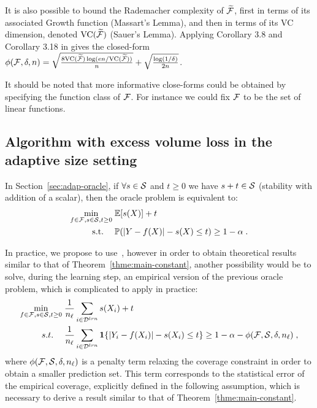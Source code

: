 It is also possible to bound the Rademacher complexity of $\widetilde{\mathcal{F}}$, first in terms of its associated Growth function (Massart's Lemma), and then in terms of its VC dimension, denoted $\text{VC}(\widetilde{\mathcal{F}})$ (Sauer's Lemma). Applying Corollary 3.8 and Corollary 3.18 in \citet{mohri2018foundations} gives the closed-form ${\phi(\mathcal{F},\delta,n)} = \sqrt{\frac{8\text{VC}(\widetilde{\mathcal{F}})\log(en/\text{VC}(\widetilde{\mathcal{F}}))}{n}}+\sqrt{\frac{\log(1/\delta)}{2n}}$.

It should be noted that more informative close-forms could be obtained by specifying the function class of $\mathcal{F}$. For instance we could fix $\mathcal{F}$ to be the set of linear functions. 




\subsection{Algorithm with excess volume loss in the adaptive size setting} %
\label{sec:adapt-bonus}




In Section~\ref{sec:adap-oracle}, if $\forall s\in {\cal S}$ and $t\geq 0$ we have $s+t\in{\cal S}$ (stability with addition of a scalar), then the oracle problem is equivalent to:
\begin{align*}
    \min_{f\in\mathcal{F},s\in{\cal S},t\geq 0} &\; \mathbb{E}[s(X)] + t \\
     \quad \text{s.t.} \quad &\;  {\mathbb{P}}(|Y-f(X)| - s(X)\leq t) \geq 1-\alpha
     \;. \nonumber
\end{align*}

In practice, we propose to use~\methodAD, however in order to obtain theoretical results similar to that of Theorem~\ref{thme:main-constant}, another possibility would be to solve, during the learning step, an empirical version of the previous oracle problem, which is complicated to apply in practice:
\begin{align}
    \min_{f\in\mathcal{F},s\in{\cal S},t\geq 0} &\; \frac{1}{n_\ell}\sum_{i\in{\cal D}^{lrn}}s(X_i) + t \label{eq:new-algo-adap} \\
     \quad s.t. \quad &\;  \frac{1}{n_\ell}\sum_{i\in{\cal D}^{lrn}}\mathbf{1}\{|Y_i-f(X_i)|-s(X_i)\leq t\}\geq 1-\alpha - {\phi(\mathcal{F},{\cal S},\delta,n_\ell)}
     \;, \nonumber
\end{align}
where ${\phi(\mathcal{F},{\cal S},\delta,n_\ell)}$ is a penalty term relaxing the coverage constraint in order to obtain a smaller prediction set. This term corresponds to the statistical error of the empirical coverage, explicitly defined in the following assumption, which is necessary to derive a result similar to that of Theorem~\ref{thme:main-constant}.

